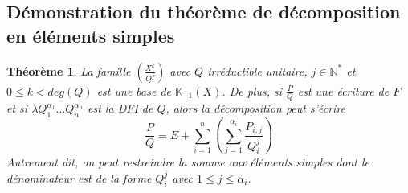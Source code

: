 \documentclass[french]{book}
\theoremstyle{plain}
\newtheorem{thm}{Théorème}[chapter]
\theoremstyle{definition}
\theoremstyle{remark}
\begin{document}
\subsection{Démonstration du théorème de décomposition en éléments simples}
\begin{thm}
	La famille $\displaystyle(\frac{X^{k}}{Q^{j}})$ avec $Q$ irréductible unitaire, $j\in\mathbb{N}^{*}$ et $0\leqslant k<deg(Q)$ est une base de $\mathbb{K}_{-1}(X)$. De plus, si $\frac{P}{Q}$ est une écriture de $F$ et si $\lambda Q_{1}^{\alpha_{1}}\ldots Q_{n}^{\alpha_{n}}$ est la DFI de $Q$, alors la décomposition peut s'écrire $$\frac{P}{Q}=E+\sum_{i=1}^{n}\left(\sum_{j=1}^{\alpha_{i}}\frac{P_{i,j}}{Q_{i}^{j}}\right)$$ Autrement dit, on peut restreindre la somme aux éléments simples dont le dénominateur est de la forme $Q_{i}^{j}$ avec $1\leqslant j\leqslant\alpha_{i}$.
\end{thm}
\end{document}
